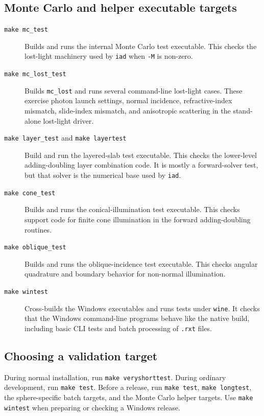 \documentclass{article}
\newcommand\iadprog{\texttt{iad}}
\begin{document}
\subsection{Monte Carlo and helper executable targets}

\begin{description}
\item[\texttt{make mc\_test}]
Builds and runs the internal Monte Carlo test executable.  This checks the
lost-light machinery used by \iadprog{} when \texttt{-M} is non-zero.

\item[\texttt{make mc\_lost\_test}]
Builds \texttt{mc\_lost} and runs several command-line lost-light cases.  These
exercise photon launch settings, normal incidence, refractive-index mismatch,
slide-index mismatch, and anisotropic scattering in the stand-alone lost-light
driver.

\item[\texttt{make layer\_test} and \texttt{make layertest}]
Build and run the layered-slab test executable.  This checks the lower-level
adding-doubling layer combination code.  It is mostly a forward-solver test, but
that solver is the numerical base used by \iadprog{}.

\item[\texttt{make cone\_test}]
Builds and runs the conical-illumination test executable.  This checks support
code for finite cone illumination in the forward adding-doubling routines.

\item[\texttt{make oblique\_test}]
Builds and runs the oblique-incidence test executable.  This checks angular
quadrature and boundary behavior for non-normal illumination.

\item[\texttt{make wintest}]
Cross-builds the Windows executables and runs tests under \texttt{wine}.  It
checks that the Windows command-line programs behave like the native build,
including basic CLI tests and batch processing of \texttt{.rxt} files.
\end{description}

\subsection{Choosing a validation target}

During normal installation, run \texttt{make veryshorttest}.  During ordinary
development, run \texttt{make test}.  Before a release, run \texttt{make test},
\texttt{make longtest}, the sphere-specific batch targets, and the Monte Carlo
helper targets.  Use \texttt{make wintest} when preparing or checking a Windows
release.
\end{document}
